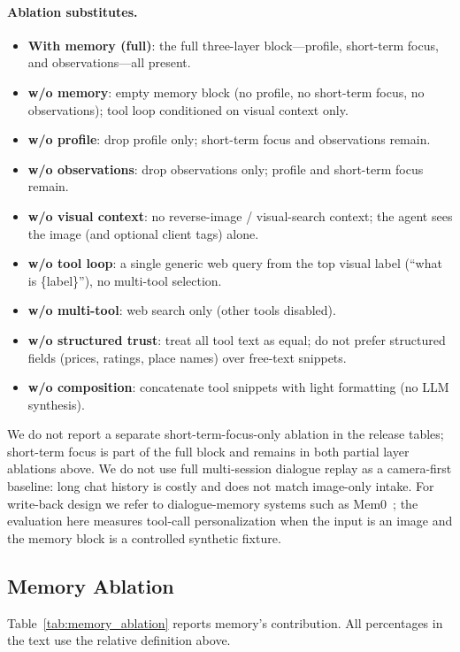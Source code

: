 \documentclass[11pt,a4paper]{article}
\begin{document}
\paragraph{Ablation substitutes.}
\begin{itemize}[leftmargin=*]
    \item \textbf{With memory (full)}: the full three-layer block---profile, short-term focus, and observations---all present.
    \item \textbf{w/o memory}: empty memory block (no profile, no short-term focus, no observations); tool loop conditioned on visual context only.
    \item \textbf{w/o profile}: drop profile only; short-term focus and observations remain.
    \item \textbf{w/o observations}: drop observations only; profile and short-term focus remain.
    \item \textbf{w/o visual context}: no reverse-image / visual-search context; the agent sees the image (and optional client tags) alone.
    \item \textbf{w/o tool loop}: a single generic web query from the top visual label (``what is \{label\}''), no multi-tool selection.
    \item \textbf{w/o multi-tool}: web search only (other tools disabled).
    \item \textbf{w/o structured trust}: treat all tool text as equal; do not prefer structured fields (prices, ratings, place names) over free-text snippets.
    \item \textbf{w/o composition}: concatenate tool snippets with light formatting (no LLM synthesis).
\end{itemize}
We do not report a separate short-term-focus-only ablation in the release tables; short-term focus is part of the full block and remains in both partial layer ablations above.
We do not use full multi-session dialogue replay as a camera-first baseline: long chat history is costly and does not match image-only intake. For write-back design we refer to dialogue-memory systems such as Mem0~\cite{mem0}; the evaluation here measures tool-call personalization when the input is an image and the memory block is a controlled synthetic fixture.

\subsection{Memory Ablation}

Table~\ref{tab:memory_ablation} reports memory's contribution. All percentages in the text use the relative definition above.
\end{document}
